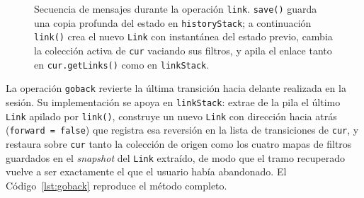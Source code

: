 \begin{figure}[H]
  \centering
  \caption[Diagrama de secuencia de \texttt{link}]{Secuencia de
  mensajes durante la operación \texttt{link}. \texttt{save()} guarda
  una copia profunda del estado en \texttt{historyStack}; a
  continuación \texttt{link()} crea el nuevo \texttt{Link} con
  instantánea del estado previo, cambia la colección activa de
  \texttt{cur} vaciando sus filtros, y apila el enlace tanto en
  \texttt{cur.getLinks()} como en \texttt{linkStack}.}
  \label{fig:seqLink}
\end{figure}

La operación \texttt{goback} revierte la última transición hacia delante realizada en
la sesión. Su implementación se apoya en \texttt{linkStack}: extrae de la pila el último
\texttt{Link} apilado por \texttt{link()}, construye un nuevo \texttt{Link} con dirección
hacia atrás (\texttt{forward = false}) que registra esa reversión en la lista de
transiciones de \texttt{cur}, y restaura sobre \texttt{cur} tanto la colección de origen
como los cuatro mapas de filtros guardados en el \textit{snapshot} del \texttt{Link} extraído, de
modo que el tramo recuperado vuelve a ser exactamente el que el usuario había abandonado.
El Código~\ref{lst:goback} reproduce el método completo.

